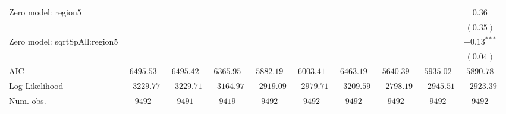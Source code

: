 \begin{center}
\begin{longtable}{l c c c c c c c c c}
Zero model: region5            &                &                &                &                 &                &                 &                 &                 & $0.36$         \\
                               &                &                &                &                 &                &                 &                 &                 & $(0.35)$       \\
Zero model: sqrtSpAll:region5  &                &                &                &                 &                &                 &                 &                 & $-0.13^{***}$  \\
                               &                &                &                &                 &                &                 &                 &                 & $(0.04)$       \\
\midrule
AIC                            & $6495.53$      & $6495.42$      & $6365.95$      & $5882.19$       & $6003.41$      & $6463.19$       & $5640.39$       & $5935.02$       & $5890.78$      \\
Log Likelihood                 & $-3229.77$     & $-3229.71$     & $-3164.97$     & $-2919.09$      & $-2979.71$     & $-3209.59$      & $-2798.19$      & $-2945.51$      & $-2923.39$     \\
Num. obs.                      & $9492$         & $9491$         & $9419$         & $9492$          & $9492$         & $9492$          & $9492$          & $9492$          & $9492$         \\
\end{longtable}
\end{center}
